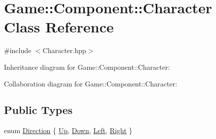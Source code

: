 \hypertarget{class_game_1_1_component_1_1_character}{}\section{Game\+:\+:Component\+:\+:Character Class Reference}
\label{class_game_1_1_component_1_1_character}


{\ttfamily \#include $<$Character.\+hpp$>$}



Inheritance diagram for Game\+:\+:Component\+:\+:Character\+:


Collaboration diagram for Game\+:\+:Component\+:\+:Character\+:
\subsection*{Public Types}
\begin{DoxyCompactItemize}
\item 
enum \mbox{\hyperlink{class_game_1_1_component_1_1_character_aa1b80f780538b76c7a948e96c54dbe87}{Direction}} \{ \mbox{\hyperlink{class_game_1_1_component_1_1_character_aa1b80f780538b76c7a948e96c54dbe87a54502c7393e5366db0d2ae48a65ab8ea}{Up}}, 
\mbox{\hyperlink{class_game_1_1_component_1_1_character_aa1b80f780538b76c7a948e96c54dbe87a06bbbd9d7113d4de804ccfc8f302a361}{Down}}, 
\mbox{\hyperlink{class_game_1_1_component_1_1_character_aa1b80f780538b76c7a948e96c54dbe87a19e0f8a04342229f6eda11d3c7207d42}{Left}}, 
\mbox{\hyperlink{class_game_1_1_component_1_1_character_aa1b80f780538b76c7a948e96c54dbe87a77889f2be386690b9c403e68c32f38a7}{Right}}
 \}
\end{DoxyCompactItemize}
